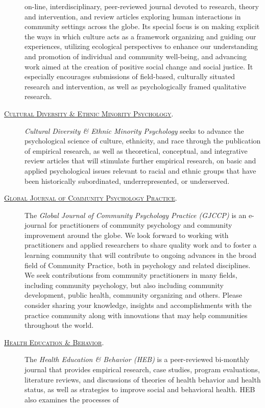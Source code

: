 \documentclass[]{tufte-handout}
\begin{document}
\begin{description}
on-line, interdisciplinary, peer-reviewed journal devoted to research,
theory and intervention, and review articles exploring human
interactions in community settings across the globe. Its special focus
is on making explicit the ways in which culture acts as a framework
organizing and guiding our experiences, utilizing ecological
perspectives to enhance our understanding and promotion of individual
and community well-being, and advancing work aimed at the creation of
positive social change and social justice. It especially encourages
submissions of field-based, culturally situated research and
intervention, as well as psychologically framed qualitative research.
\item[\href{http://www.apa.org/pubs/journals/cdp/}{\textsc{Cultural Diversity \& Ethnic Minority Psychology}}.]
\emph{Cultural Diversity \& Ethnic Minority Psychology} seeks to advance
the psychological science of culture, ethnicity, and race through the
publication of empirical research, as well as theoretical, conceptual,
and integrative review articles that will stimulate further empirical
research, on basic and applied psychological issues relevant to racial
and ethnic groups that have been historically subordinated,
underrepresented, or underserved.
\item[\href{http://www.gjcpp.org/}{\textsc{Global Journal of Community Psychology Practice}}.]
The \emph{Global Journal of Community Psychology Practice (GJCCP)} is an
e-journal for practitioners of community psychology and community
improvement around the globe. We look forward to working with
practitioners and applied researchers to share quality work and to
foster a learning community that will contribute to ongoing advances in
the broad field of Community Practice, both in psychology and related
disciplines. We seek contributions from community practitioners in many
fields, including community psychology, but also including community
development, public health, community organizing and others. Please
consider sharing your knowledge, insights and accomplishments with the
practice community along with innovations that may help communities
throughout the world.
\item[\href{http://heb.sagepub.com/}{\textsc{Health Education \& Behavior}}.]
The \emph{Health Education \& Behavior (HEB)} is a peer-reviewed
bi-monthly journal that provides empirical research, case studies,
program evaluations, literature reviews, and discussions of theories of
health behavior and health status, as well as strategies to improve
social and behavioral health. HEB also examines the processes of

\end{description}
\end{document}
